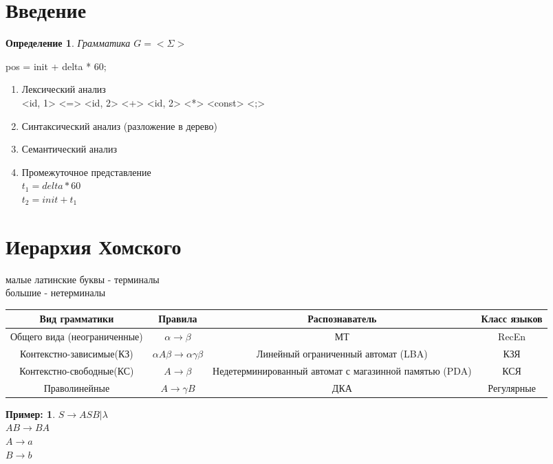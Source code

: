 \documentclass[11pt]{article}
\newtheorem*{df}{Определение}
\theoremstyle{break}
\newtheorem*{example}{Пример:}
\begin{document}
\raggedright
\begin{sloppypar}
\section*{Введение}

\begin{df}
Грамматика $G = <\Sigma>$
\end{df}

pos = init + delta * 60;
\begin{enumerate}
\item Лексический анализ \\
<id, 1> <=> <id, 2> <+> <id, 2> <*> <const> <;>
\item Синтаксический анализ (разложение в дерево)
\item Семантический анализ
\item Промежуточное представление \\
$t_1 = delta * 60$ \\
$t_2 = init + t_1$
\end{enumerate}

\section*{Иерархия Хомского}
малые латинские буквы - терминалы \\
большие - нетерминалы

\begin{tabulary}{\linewidth}{|C|c|C|c|}
\hline
Вид грамматики & Правила & Распознаватель & Класс языков \\
\hline\hline
Общего вида (неограниченные) & $\alpha \rightarrow \beta$ & МТ & RecEn \\
\hline
Контекстно-зависимые(КЗ) & $\alpha A \beta \rightarrow \alpha \gamma \beta$ & Линейный ограниченный автомат (LBA) & КЗЯ \\
\hline
Контекстно-свободные(КС) & $A \rightarrow \beta$ & Недетерминированный автомат с магазинной памятью (PDA) & КСЯ \\
\hline
Праволинейные & $A \rightarrow \gamma B$ & ДКА & Регулярные \\
\hline
\end{tabulary}

\begin{example}
$S \rightarrow ASB|\lambda$ \\
$AB \rightarrow BA$ \\
$A \rightarrow a$ \\
$B \rightarrow b$


\end{example}
\end{sloppypar}
\end{document}

